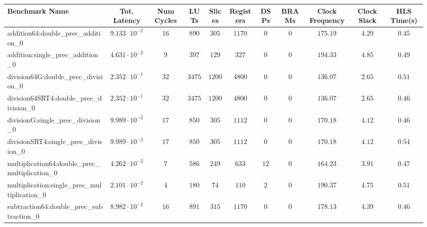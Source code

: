 \begin{tabular}{|l|c|c|c|c|c|c|c|c|c|c|}
\hline
Benchmark Name                                   & Tot. Latency            & Num Cycles & LUTs      & Slices   & Registers & DSPs   & BRAMs & Clock Frequency & Clock Slack & HLS Time(s) \\
\hline
addition64:double\_prec\_addition\_0             & $ 9.133 \cdot 10^{-2} $ & $ 16     $ & $ 890   $ & $ 305  $ & $ 1170  $ & $ 0  $ & $ 0 $ & $ 175.19      $ & $ 4.29    $ & $ 0.45    $ \\
addition:single\_prec\_addition\_0               & $ 4.631 \cdot 10^{-2} $ & $ 9      $ & $ 397   $ & $ 129  $ & $ 327   $ & $ 0  $ & $ 0 $ & $ 194.33      $ & $ 4.85    $ & $ 0.49    $ \\
division64G:double\_prec\_division\_0            & $ 2.352 \cdot 10^{-1} $ & $ 32     $ & $ 3475  $ & $ 1200 $ & $ 4800  $ & $ 0  $ & $ 0 $ & $ 136.07      $ & $ 2.65    $ & $ 0.51    $ \\
division64SRT4:double\_prec\_division\_0         & $ 2.352 \cdot 10^{-1} $ & $ 32     $ & $ 3475  $ & $ 1200 $ & $ 4800  $ & $ 0  $ & $ 0 $ & $ 136.07      $ & $ 2.65    $ & $ 0.46    $ \\
divisionG:single\_prec\_division\_0              & $ 9.989 \cdot 10^{-2} $ & $ 17     $ & $ 850   $ & $ 305  $ & $ 1112  $ & $ 0  $ & $ 0 $ & $ 170.18      $ & $ 4.12    $ & $ 0.46    $ \\
divisionSRT4:single\_prec\_division\_0           & $ 9.989 \cdot 10^{-2} $ & $ 17     $ & $ 850   $ & $ 305  $ & $ 1112  $ & $ 0  $ & $ 0 $ & $ 170.18      $ & $ 4.12    $ & $ 0.54    $ \\
multiplication64:double\_prec\_multiplication\_0 & $ 4.262 \cdot 10^{-2} $ & $ 7      $ & $ 586   $ & $ 249  $ & $ 633   $ & $ 12 $ & $ 0 $ & $ 164.23      $ & $ 3.91    $ & $ 0.47    $ \\
multiplication:single\_prec\_multiplication\_0   & $ 2.101 \cdot 10^{-2} $ & $ 4      $ & $ 180   $ & $ 74   $ & $ 110   $ & $ 2  $ & $ 0 $ & $ 190.37      $ & $ 4.75    $ & $ 0.51    $ \\
subtraction64:double\_prec\_subtraction\_0       & $ 8.982 \cdot 10^{-2} $ & $ 16     $ & $ 891   $ & $ 315  $ & $ 1170  $ & $ 0  $ & $ 0 $ & $ 178.13      $ & $ 4.39    $ & $ 0.46    $ \\

\end{tabular}
